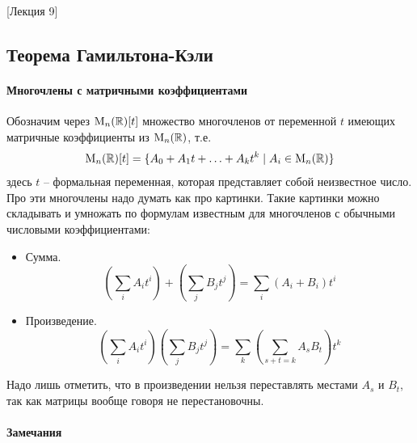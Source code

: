 [Лекция 9]


\subsection{Теорема Гамильтона-Кэли}

\paragraph{Многочлены с матричными коэффициентами}

Обозначим через $\operatorname{M}_{n}(\mathbb R)[t]$ множество многочленов от переменной $t$ имеющих матричные коэффициенты из $\operatorname{M}_{n}(\mathbb R)$, т.е.
\[
\operatorname{M}_{n}(\mathbb R)[t] = \{A_0+A_1t+\ldots + A_k t^k\mid A_i\in \operatorname{M}_{n}(\mathbb R)\}
\]
здесь $t$ -- формальная переменная, которая представляет собой неизвестное число.
Про эти многочлены надо думать как про картинки.
Такие картинки можно складывать и умножать по формулам известным для многочленов с обычными числовыми коэффициентами:
\begin{itemize}
\item Сумма.
\[
\left(\sum_{i}A_i t^i\right) +\left (\sum_{j}B_j t^j\right) = \sum_{i}(A_i+ B_i) t^i
\]

\item Произведение.
\[
\left(\sum_i A_i t^i\right)\left( \sum_j B_j t^j\right) = \sum_k \left(\sum_{s+t = k}A_s B_t\right)t^k
\]
\end{itemize}
Надо лишь отметить, что в произведении нельзя переставлять местами $A_s$ и $B_t$, так как матрицы вообще говоря не перестановочны.

\paragraph{Замечания}

